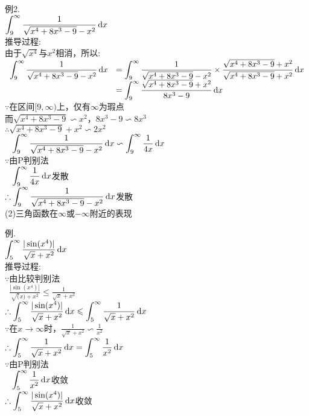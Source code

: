 例2.\\
$\displaystyle\int_9^{\infty}\frac{1}{\sqrt{x^4+8x^3-9}-x^2}\mathop{}\!\mathrm{d} x$\\
推导过程:\\
由于$\sqrt{x^4}$与$x^2$相消，所以:\\
$\begin{array}{>{\displaystyle}r >{\displaystyle}l}
\int_9^{\infty}\frac{1}{\sqrt{x^4+8x^3-9}-x^2}\dif x & =\int_9^{\infty}\frac{1}{\sqrt{x^4+8x^3-9}-x^2}\times\frac{\sqrt{x^4+8x^3-9}+x^2}{\sqrt{x^4+8x^3-9}+x^2}\dif x\\
& =\int_9^{\infty}\frac{\sqrt{x^4+8x^3-9}+x^2}{8x^3-9}\dif x
\end{array}$\\
$\because$在区间$[9,\infty)$上，仅有$\infty$为瑕点\\
\phantom{$\because$}而$\sqrt{x^4+8x^3-9}\backsim x^2$，$8x^3-9\backsim 8x^3$\\
$\therefore\sqrt{x^4+8x^3-9}+x^2\backsim 2x^2$\\
$\displaystyle\phantom{\therefore}\int_9^{\infty}\frac{1}{\sqrt{x^4+8x^3-9}-x^2}\mathop{}\!\mathrm{d} x\backsim\int_9^{\infty}\frac{1}{4x}\mathop{}\!\mathrm{d} x$\\
$\because$由P判别法\\
$\displaystyle\phantom{\because}\int_9^{\infty}\frac{1}{4x}\mathop{}\!\mathrm{d} x$发散\\
$\displaystyle\therefore\int_9^{\infty}\frac{1}{\sqrt{x^4+8x^3-9}-x^2}\mathop{}\!\mathrm{d} x$发散\\[2ex]

(2)三角函数在$\infty$或$-\infty$附近的表现
{\par\centering
{}
\par}
例.\\
$\displaystyle\int_5^{\infty}\frac{|\sin(x^4)|}{\sqrt{x}+x^2}\mathop{}\!\mathrm{d} x$\\
推导过程:\\
$\because$由比较判别法\\
$\displaystyle\phantom{\because}\frac{|\sin(x^4)|}{\sqrt(x)+x^2}\leqslant\frac{1}{\sqrt{x}+x^2}$\\
$\displaystyle\therefore\int_5^{\infty}\frac{|\sin(x^4)|}{\sqrt{x}+x^2}\mathop{}\!\mathrm{d} x\leqslant\int_5^{\infty}\frac{1}{\sqrt{x}+x^2}\mathop{}\!\mathrm{d} x$\\
$\because$在$x\to\infty$时，$\displaystyle\frac{1}{\sqrt{x}+x^2}\backsim\frac{1}{x^2}$\\
$\displaystyle\therefore\int_5^{\infty}\frac{1}{\sqrt{x}+x^2}\mathop{}\!\mathrm{d} x=\int_5^{\infty}\frac{1}{x^2}\mathop{}\!\mathrm{d} x$\\
$\because$由P判别法\\
$\displaystyle\phantom{\because}\int_5^{\infty}\frac{1}{x^2}\mathop{}\!\mathrm{d} x$收敛\\
$\displaystyle\therefore\int_5^{\infty}\frac{|\sin(x^4)|}{\sqrt{x}+x^2}\mathop{}\!\mathrm{d} x$收敛\\[2ex]

